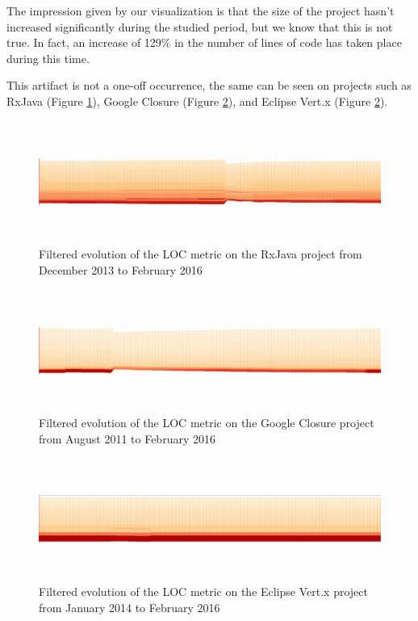 The impression given by our visualization is that the size of the project hasn't increased significantly during the studied period, but we know that this is not true. In fact, an increase of 129\% in the number of lines of code has taken place during this time.

This artifact is not a one-off occurrence, the same can be seen on projects such as RxJava (Figure \ref{fig:stream_rxjava}), Google Closure (Figure \ref{fig:stream_closure}), and Eclipse Vert.x (Figure \ref{fig:stream_closure}).

\begin{figure}[H]
  \centering
  \includegraphics[width=1.0\textwidth,height=4.0cm]{figures/stream_rxjava.png}
  \caption{Filtered evolution of the LOC metric on the RxJava project from December 2013 to February 2016}
  \label{fig:stream_rxjava}
\end{figure}

\begin{figure}[H]
  \centering
  \includegraphics[width=1.0\textwidth,height=4.0cm]{figures/stream_closure.png}
  \caption{Filtered evolution of the LOC metric on the Google Closure project from August 2011 to February 2016}
  \label{fig:stream_closure}
\end{figure}

\begin{figure}[H]
  \centering
  \includegraphics[width=1.0\textwidth,height=4.0cm]{figures/stream_vertx.png}
  \caption{Filtered evolution of the LOC metric on the Eclipse Vert.x project from January 2014 to February 2016}
  \label{fig:stream_vertx}
\end{figure}

